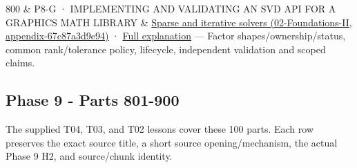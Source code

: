 {\begin{longtable}[]
800 & P8-G · IMPLEMENTING AND VALIDATING AN SVD API FOR A GRAPHICS MATH LIBRARY & \href{}{Sparse and iterative solvers (02-Foundations-II, appendix-67c87a3d9e94)} · \href{Continuous\%20Notes/Computing\%20Foundations\%20-\%20From\%20Bits\%20to\%20C++\%20and\%20Systems\%20APIs\#An\%20SVD\%20API\%20begins\%20with\%20shapes\%20and\%20guarantees/}{Full explanation} --- Factor shapes/ownership/status, common rank/tolerance policy, lifecycle, independent validation and scoped claims. \\
\end{longtable}
}

\subsection{Phase 9 - Parts 801-900}\label{phase-9---parts-801-900}

The supplied T04, T03, and T02 lessons cover these 100 parts. Each row preserves the exact source title, a short source opening/mechanism, the actual Phase 9 H2, and source/chunk identity.

